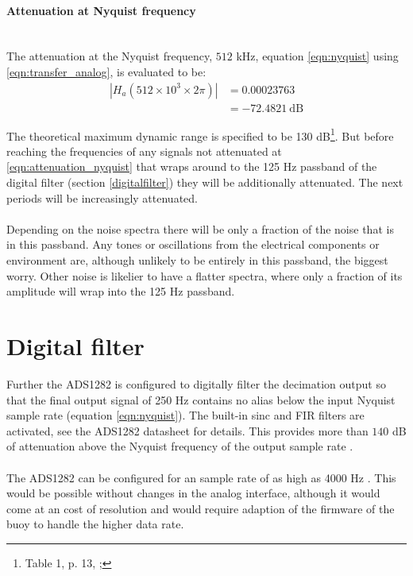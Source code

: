 \documentclass[a4paper]{article}
\begin{document}
\begin{multicols}{2}
\paragraph{Attenuation at Nyquist frequency}\ \\
The attenuation at the Nyquist
frequency, $512$ kHz, equation \eqref{eqn:nyquist} using
\eqref{eqn:transfer_analog}, is evaluated to be:
\begin{equation}
  \begin{aligned}
  | H_a(512 \times 10^3 \times 2 \pi) | &= 0.00023763 \\
                                        &= -72.4821\ \text{dB}
  \end{aligned}
  \label{eqn:attenuation_nyquist}
\end{equation}

The theoretical maximum dynamic range is specified to be 130
dB\footnote{Table 1, p. 13, \cite{ads1282_ds}; }.
But before reaching the frequencies of any signals not attenuated at
\eqref{eqn:attenuation_nyquist} that wraps around to the 125 Hz passband of
the digital filter (section \ref{digitalfilter}) they will be additionally
attenuated. The next periods will be increasingly attenuated.
\paragraph{} Depending on the noise spectra there will
be only a fraction of the noise that is in this passband. Any tones or
oscillations from the electrical components or environment are, although
unlikely to be entirely in this passband, the biggest worry. Other noise
is likelier to have a flatter spectra, where only a fraction of its
amplitude will wrap into the 125 Hz passband.


\label{digitalfilter}
\section{Digital filter}
Further the ADS1282 is configured to digitally filter the decimation
output so that the final output signal of 250 Hz contains no alias below
the input Nyquist sample rate (equation \eqref{eqn:nyquist}). The
built-in sinc and FIR filters are activated, see the ADS1282 datasheet
\cite{ads1282_ds} for details. This provides more
than $140$ dB of attenuation above the Nyquist frequency of the output
sample rate \cite{ads1282_ds}.
\paragraph{}The
ADS1282 can be configured for an sample rate of as high as 4000 Hz
\cite{ads1282_ds}. This would be possible without changes in the analog
interface, although it would come at an cost of resolution and would
require adaption of the firmware of the buoy to handle the higher data
rate.


\end{multicols}
\end{document}
